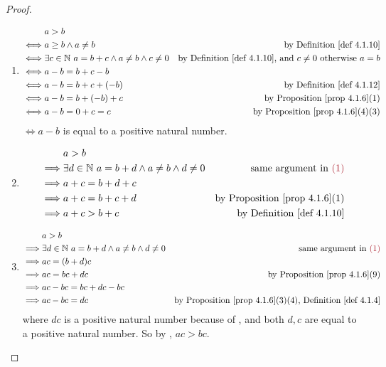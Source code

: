 \begin{proof}
\begin{enumerate}
\item {}
    \begin{align*}
             & a > b \\
        \iff & a \ge b \land a \neq b & \text{by \DEF{4.1.10}} \\
        \iff & \exists c \in \SET{N}\ a = b + c \land a \neq b \land c \neq 0 & \text{by \DEF{4.1.10}, and \(c \neq 0\) otherwise \(a = b\)} \\
        \iff & a - b = b + c - b \\
        \iff & a - b = b + c + (-b) & \text{by \DEF{4.1.12}} \\
        \iff & a - b = b + (-b) + c & \text{by \PROP{4.1.6}(1)} \\
        \iff & a - b = 0 + c = c & \text{by \PROP{4.1.6}(4)(3)} \\
    \end{align*}
    \(\iff a - b\) is equal to a positive natural number.

\item
    \begin{align*}
                 & a > b \\
        \implies & \exists d \in \SET{N}\ a = b + d \land a \neq b \land d \neq 0 & \text{same argument in \MAROON{(1)}} \\
        \implies & a + c = b + d + c \\
        \implies & a + c = b + c + d & \text{by \PROP{4.1.6}(1)} \\
        \implies & a + c > b + c & \text{by \DEF{4.1.10}}
    \end{align*}

\item
    \begin{align*}
                 & a > b \\
        \implies & \exists d \in \SET{N}\ a = b + d \land a \neq b \land d \neq 0 & \text{same argument in \MAROON{(1)}} \\
        \implies & ac = (b + d)c \\
        \implies & ac = bc + dc & \text{by \PROP{4.1.6}(9)} \\
        \implies & ac - bc = bc + dc - bc \\
        \implies & ac - bc = dc & \text{by \PROP{4.1.6}(3)(4), \DEF{4.1.4}}
    \end{align*}
    where \(dc\) is a positive natural number because of , and both \(d, c\) are equal to a positive natural number.
    So by , \(ac > bc\).


\end{enumerate}
\end{proof}
